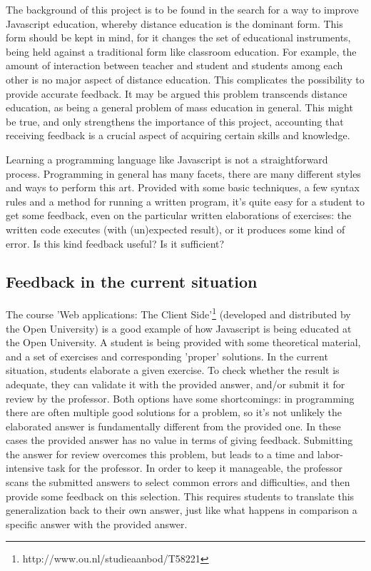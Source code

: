\documentclass{article}
\begin{document}
The background of this project is to be found in the search for a way to improve Javascript education, whereby distance education is the dominant form. This form should be kept in mind, for it changes the set of educational instruments, being held against a traditional form like classroom education. For example, the amount of interaction between teacher and student and students among each other is no major aspect of distance education. This complicates the possibility to provide accurate feedback. It may be argued this problem transcends distance education, as being a general problem of mass education in general. This might be true, and only strengthens the importance of this project, accounting that receiving feedback is a crucial aspect of acquiring certain skills and knowledge. 

Learning a programming language like Javascript is not a straightforward process. Programming in general has many facets, there are many different styles and ways to perform this art. Provided with some basic techniques, a few syntax rules and a method for running a written program, it's quite easy for a student to get some feedback, even on the particular written elaborations of exercises: the written code executes (with (un)expected result), or it produces some kind of error. Is this kind feedback useful? Is it sufficient? 

\subsection{Feedback in the current situation}

The course 'Web applications: The Client Side'\footnote{http://www.ou.nl/studieaanbod/T58221} (developed and distributed by the Open University) is a good example of how Javascript is being educated at the Open University. A student is being provided with some theoretical material, and a set of exercises and corresponding 'proper' solutions. In the current situation, students elaborate a given exercise. To check whether the result is adequate, they can validate it with the provided answer, and/or submit it for review by the professor. Both options have some shortcomings: in programming there are often multiple good solutions for a problem, so it’s not unlikely the elaborated answer is fundamentally different from the provided one. In these cases the provided answer has no value in terms of giving feedback. Submitting the answer for review overcomes this problem, but leads to a time and labor-intensive task for the professor. In order to keep it manageable, the professor scans the submitted answers to select common errors and difficulties, and then provide some feedback on this selection. This requires students to translate this generalization back to their own answer, just like what happens in comparison a specific answer with the provided answer.
\end{document}
